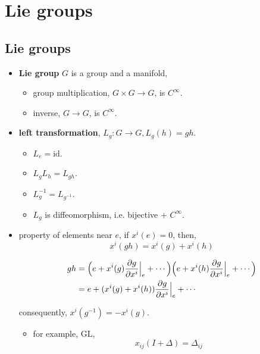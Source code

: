 \chapter{Lie groups}
\section{Lie groups}
\begin{itemize}
	\item \textbf{Lie group} $G$ is a group and a manifold,
	\begin{itemize}
		\item group multiplication, $G \times G \rightarrow G$, is $C^\infty$.
		
		\item inverse, $G \rightarrow G$, is $C^\infty$.
	\end{itemize}
	
	\item \textbf{left transformation}, $L_g: G \rightarrow G, L_g(h) = g h$.
	\begin{itemize}
		\item $L_e = \mathrm{id}$.
		
		\item $L_g L_h = L_{g h}$.
		
		\item $L_g^{-1} = L_{g^{-1}}$.
		
		\item $L_g$ is diffeomorphism, i.e. bijective + $C^\infty$.
	\end{itemize}
	
	\item property of elements near $e$, if $x^i(e) = 0$, then,
	\begin{equation}
		x^i(g h) = x^i(g) + x^i(h)
	\end{equation}
	
	\begin{tcolorbox}[title=proof:]
		\begin{align}
			g h &= \Big( e + x^i(g) \frac{\partial g}{\partial x^i} \Big|_e + \cdots \Big) \Big( e + x^i(h) \frac{\partial g}{\partial x^i} \Big|_e + \cdots \Big) \notag \\
			&= e + (x^i(g) + x^i(h)) \frac{\partial g}{\partial x^i} \Big|_e + \cdots
		\end{align}
	\end{tcolorbox}
	
	consequently, $x^i(g^{-1}) = - x^i(g)$.
	\begin{itemize}
		\item for example, $\mathrm{GL}$,
		\begin{equation}
			x_{i j}(I + \Delta) = \Delta_{i j}
		\end{equation}
	\end{itemize}
\end{itemize}

